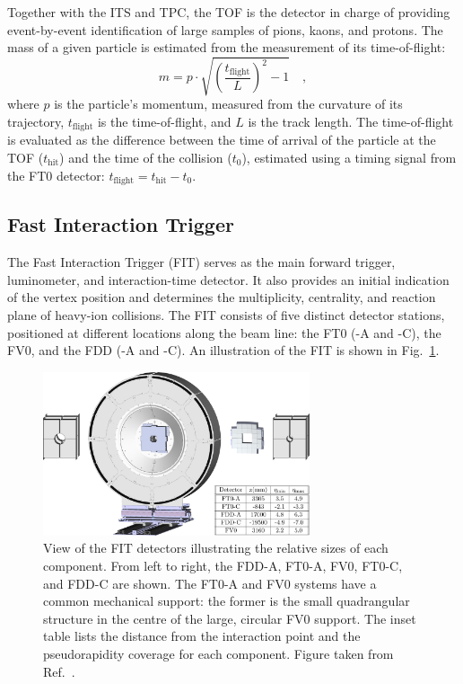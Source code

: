 Together with the ITS and TPC, the TOF is the detector in charge of providing event-by-event identification of large samples of pions, kaons, and protons. The mass of a given particle is estimated from the measurement of its time-of-flight:
\begin{equation}
    m = p \cdot \sqrt{\left(\frac{t_\mathrm{flight}}{L}\right)^2 - 1}\quad ,
\end{equation} 
where $p$ is the particle's momentum, measured from the curvature of its trajectory, $t_\mathrm{flight}$ is the time-of-flight, and $L$ is the track length. The time-of-flight is evaluated as the difference between the time of arrival of the particle at the TOF ($t_\mathrm{hit}$) and the time of the collision ($t_0$), estimated using a timing signal from the FT0 detector: $t_\mathrm{flight} = t_\mathrm{hit} - t_0$.

\subsection{Fast Interaction Trigger}\label{subsec:FIT}
The Fast Interaction Trigger (FIT) serves as the main forward trigger, luminometer, and interaction-time detector. It also provides an initial indication of the vertex position and determines the multiplicity, centrality, and reaction plane of heavy-ion collisions. The FIT consists of five distinct detector stations, positioned at different locations along the beam line: the FT0 (-A and -C), the FV0, and the FDD (-A and -C). An illustration of the FIT is shown in Fig.~\ref{fig:FIT}.

\begin{figure}[htb]
    \centering
    \includegraphics[width=0.7\textwidth]{Figures/Chapter 3/FIT_Scheme.png}
    \caption{View of the FIT detectors illustrating the relative sizes of each component. From left to right, the FDD-A, FT0-A, FV0, FT0-C, and FDD-C are shown. The FT0-A and FV0 systems have a common mechanical support: the former is the small quadrangular structure in the centre of the large, circular FV0 support. The inset table lists the distance from the interaction point and the pseudorapidity coverage for each component. Figure taken from Ref.~\cite{ALICE:2023udb}.}
    \label{fig:FIT}
\end{figure}

